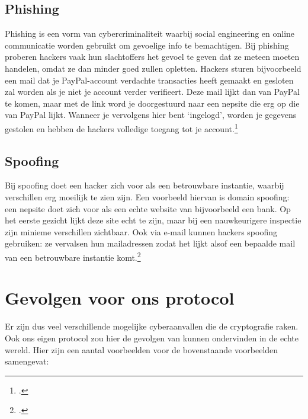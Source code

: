 \documentclass{report} %
\begin{document}
\subsection{Phishing}
Phishing is een vorm van cybercriminaliteit waarbij social engineering en online communicatie worden gebruikt om gevoelige info te bemachtigen. Bij phishing proberen hackers vaak hun slachtoffers het gevoel te geven dat ze meteen moeten handelen, omdat ze dan minder goed zullen opletten. Hackers sturen bijvoorbeeld een mail dat je PayPal-account verdachte transacties heeft gemaakt en gesloten zal worden als je niet je account verder verifieert. Deze mail lijkt dan van PayPal te komen, maar met de link word je doorgestuurd naar een nepsite die erg op die van PayPal lijkt. Wanneer je vervolgens hier bent ‘ingelogd’, worden je gegevens gestolen en hebben de hackers volledige toegang tot je account.\footnote{\cite{cybercrowdstrike}.}

\subsection{Spoofing}
Bij spoofing doet een hacker zich voor als een betrouwbare instantie, waarbij verschillen erg moeilijk te zien zijn. Een voorbeeld hiervan is domain spoofing: een nepsite doet zich voor als een echte website van bijvoorbeeld een bank. Op het eerste gezicht lijkt deze site echt te zijn, maar bij een nauwkeurigere inspectie zijn minieme verschillen zichtbaar. Ook via e-mail kunnen hackers spoofing gebruiken: ze vervalsen hun mailadressen zodat het lijkt alsof een bepaalde mail van een betrouwbare instantie komt.\footnote{\cite{cybercrowdstrike}.}

\section{Gevolgen voor ons protocol}
Er zijn dus veel verschillende mogelijke cyberaanvallen die de cryptografie raken. Ook ons eigen protocol zou hier de gevolgen van kunnen ondervinden in de echte wereld. Hier zijn een aantal voorbeelden voor de bovenstaande voorbeelden samengevat:
\end{document}
